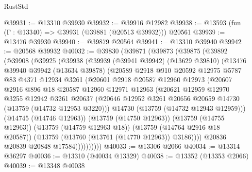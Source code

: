 \begin{lexlean}{RustStd}
\begin{coremodule}
@39931 := @13310 @39930
@39932 := @39916 @12982
@39938 := @13593 (fun (Γ : @13340) => @39931 (@39881 (@20513 @39932))) @20561
@39939 := @13476 @39930
@39940 := @39879 @20564
@39941 := @13310 @39940
@39942 := @20568 @39932
@40032 := @39830
    (@39871
      (@39873
        (@39875
          (@39892
            (@39908
              (@39925
                (@39938
                  (@39939
                    (@39941 @39942)
                    (@13629 @39810)
                    (@13476
                      @39940
                      @39942
                      (@13634 @39878)
                      (@20589
                        @2918
                        @910
                        @20592
                        @12975
                        @5787
                        @83
                        @4371
                        @12934
                        @3261
                        (@20601
                          @2918
                          @20587
                          @12960
                          @12973
                          (@20607
                            @2916
                            @896
                            @18
                            @20587
                            @12960
                            @12971
                            @12963
                            (@20621
                              @12959
                              @12970
                              @3255
                              @12942
                              @3261
                              @20637
                              (@20646
                                @12952
                                @3261
                                @20656
                                @20659
                                @14730
                                (@13759 (@14732 @12953 @3220)))
                              @14730
                              (@13759 (@14732 @12943 @12959)))
                            (@14745 (@14746 @12963))
                            (@13759 (@14750 @12963))
                            (@13759 (@14755 @12963))
                            (@13759 (@14759 @12963 @18))
                            (@13759 (@14764 @2916 @18 @20587))
                            (@13759 (@13760 (@13761 (@14770 @12963)) @3186))))
                        @20836
                        @20839
                        @20848
                        @17584))))))))))
@40033 := @13306 @2066
@40034 := @13314 @36297
@40036 := @13310 (@40034 @13329)
@40038 := @13352 (@13353 @2066)
@40039 := @13348 @40038

\end{coremodule}
\end{lexlean}
